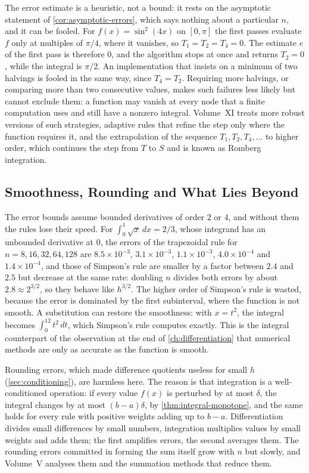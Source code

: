 The error estimate is a heuristic, not a bound: it rests on the asymptotic statement of \cref{cor:asymptotic-errors}, which says nothing about a particular $n$, and it can be fooled. For $f(x)=\sin^2(4x)$ on $[0,\pi]$ the first passes evaluate $f$ only at multiples of $\pi/4$, where it vanishes, so $T_1=T_2=T_4=0$. The estimate $e$ of the first pass is therefore $0$, and the algorithm stops at once and returns $T_2=0$, while the integral is $\pi/2$. An implementation that insists on a minimum of two halvings is fooled in the same way, since $T_4=T_2$. Requiring more halvings, or comparing more than two consecutive values, makes such failures less likely but cannot exclude them: a function may vanish at every node that a finite computation uses and still have a nonzero integral. Volume~XI treats more robust versions of such strategies, adaptive rules that refine the step only where the function requires it, and the extrapolation of the sequence $T_1,T_2,T_4,\ldots$ to higher order, which continues the step from $T$ to $S$ and is known as Romberg integration.

\subsection{Smoothness, Rounding and What Lies Beyond}

The error bounds assume bounded derivatives of order $2$ or $4$, and without them the rules lose their speed. For $\int_0^1\sqrt x\,dx=2/3$, whose integrand has an unbounded derivative at $0$, the errors of the trapezoidal rule for $n=8,16,32,64,128$ are $8.5\times10^{-3}$, $3.1\times10^{-3}$, $1.1\times10^{-3}$, $4.0\times10^{-4}$ and $1.4\times10^{-4}$, and those of Simpson's rule are smaller by a factor between $2.4$ and $2.5$ but decrease at the same rate: doubling $n$ divides both errors by about $2.8\approx2^{3/2}$, so they behave like $h^{3/2}$. The higher order of Simpson's rule is wasted, because the error is dominated by the first subinterval, where the function is not smooth. A substitution can restore the smoothness: with $x=t^2$, the integral becomes $\int_0^12t^2\,dt$, which Simpson's rule computes exactly. This is the integral counterpart of the observation at the end of \cref{ch:differentiation} that numerical methods are only as accurate as the function is smooth.

Rounding errors, which made difference quotients useless for small $h$ (\cref{sec:conditioning}), are harmless here. The reason is that integration is a well-conditioned operation: if every value $f(x)$ is perturbed by at most $\delta$, the integral changes by at most $(b-a)\delta$, by \cref{thm:integral-monotone}, and the same holds for every rule with positive weights adding up to $b-a$. Differentiation divides small differences by small numbers, integration multiplies values by small weights and adds them; the first amplifies errors, the second averages them. The rounding errors committed in forming the sum itself grow with $n$ but slowly, and Volume~V analyses them and the summation methods that reduce them.

